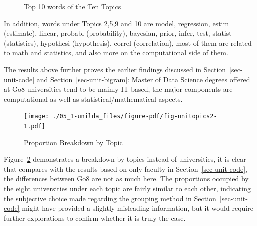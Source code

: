\documentclass[
  letterpaper,
  DIV=11,
  numbers=noendperiod]{scrreport}
\begin{document}
\begin{figure}
{\begin{table}
\begin{tabular}{>{}l|>{}l|>{}l|>{}l|>{}l|>{}l|>{}l|>{}l|>{}l|>{}l}
\hline
\cellcolor[HTML]{A6CEE3}{\textcolor{white}{may}} & \cellcolor[HTML]{1F78B4}{\textcolor{white}{can}} & \cellcolor[HTML]{B2DF8A}{\textcolor{white}{popul}} & \cellcolor[HTML]{33A02C}{\textcolor{white}{mathcal}} & \cellcolor[HTML]{FB9A99}{\textcolor{white}{use}} & \cellcolor[HTML]{E31A1C}{\textcolor{white}{comput}} & \cellcolor[HTML]{FDBF6F}{\textcolor{white}{normal}} & \cellcolor[HTML]{FF7F00}{\textcolor{white}{operatornam\_e}} & \cellcolor[HTML]{CAB2D6}{\textcolor{white}{measur}} & \cellcolor[HTML]{6A3D9A}{\textcolor{white}{space}}\\
\hline
\end{tabular}
\endgroup{}
\end{table}

}

\caption{\label{fig-topics}Top 10 words of the Ten Topics}

\end{figure}

In addition, words under Topics 2,5,9 and 10 are model, regression,
estim (estimate), linear, probabl (probability), bayesian, prior, infer,
test, statist (statistics), hypothesi (hypothesis), correl
(correlation), most of them are related to math and statistics, and also
more on the computational side of them.

The results above further proves the earlier findings discussed in
Section~\ref{sec-unit-code} and Section~\ref{sec-unit-bigram}: Master of
Data Science degrees offered at Go8 universities tend to be mainly IT
based, the major components are computational as well as
statistical/mathematical aspects.

\begin{figure}

{\centering \texttt{[image: ./05\_1-unilda\_files/figure-pdf/fig-unitopics2-1.pdf]}

}

\caption{\label{fig-unitopics2}Proportion Breakdown by Topic}

\end{figure}

Figure~\ref{fig-unitopics2} demonstrates a breakdown by topics instead
of universities, it is clear that compares with the results based on
only faculty in Section~\ref{sec-unit-code}, the differences between Go8
are not as much here. The proportions occupied by the eight universities
under each topic are fairly similar to each other, indicating the
subjective choice made regarding the grouping method in
Section~\ref{sec-unit-code} might have provided a slightly misleading
information, but it would require further explorations to confirm
whether it is truly the case.
\end{document}

